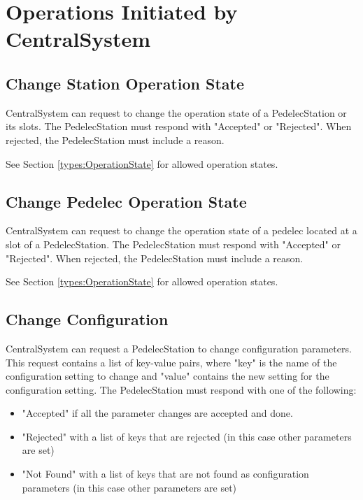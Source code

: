 \section{Operations Initiated by CentralSystem}

\subsection{Change Station Operation State}

CentralSystem can request to change the operation state of a PedelecStation or its slots. The PedelecStation must respond with "Accepted" or "Rejected". When rejected, the PedelecStation must include a reason.

 See Section \ref{types:OperationState} for allowed operation states.

\subsection{Change Pedelec Operation State}

CentralSystem can request to change the operation state of a pedelec located at a slot of a PedelecStation. The PedelecStation must respond with "Accepted" or "Rejected". When rejected, the PedelecStation must include a reason.

 See Section \ref{types:OperationState} for allowed operation states.

\subsection{Change Configuration}

CentralSystem can request a PedelecStation to change configuration parameters. This request contains a list of key-value pairs, where "key" is the name of the configuration setting to change and "value" contains the new setting for the configuration setting. The PedelecStation must respond with one of the following:
\begin{itemize}
	\item "Accepted" if all the parameter changes are accepted and done.
	\item "Rejected" with a list of keys that are rejected (in this case other parameters are set)
	\item "Not Found" with a list of keys that are not found as configuration parameters (in this case other parameters are set)
\end{itemize}

